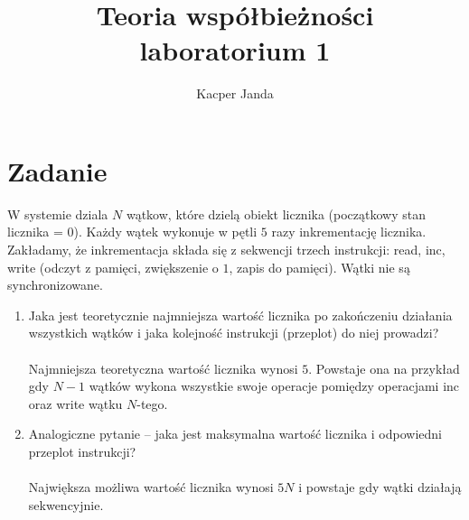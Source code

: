 \documentclass[11pt, a4paper]{article}
\begin{document}
\title{Teoria współbieżności\\laboratorium 1}
\author{Kacper Janda}
\maketitle

\section{Zadanie}
W systemie dziala \begin{math} N \end{math} wątkow, które dzielą obiekt licznika (początkowy stan licznika = \begin{math} 0 \end{math}). Każdy wątek wykonuje w pętli \begin{math} 5 \end{math} razy inkrementację licznika. Zakładamy, że inkrementacja składa się z sekwencji trzech instrukcji: read, inc, write (odczyt z pamięci, zwiększenie o \begin{math} 1 \end{math}, zapis do pamięci). Wątki nie są synchronizowane.

\begin{enumerate}

\item Jaka jest teoretycznie najmniejsza wartość licznika po zakończeniu działania wszystkich wątków i jaka kolejność instrukcji (przeplot) do niej prowadzi?\\\\
Najmniejsza teoretyczna wartość licznika wynosi \begin{math} 5 \end{math}. Powstaje ona na przykład gdy \begin{math} N-1 \end{math} wątków wykona wszystkie swoje operacje pomiędzy operacjami inc oraz write wątku \begin{math} N \end{math}-tego.\\

\item Analogiczne pytanie -- jaka jest maksymalna wartość licznika i odpowiedni przeplot instrukcji?\\\\
Największa możliwa wartość licznika wynosi \begin{math} 5N \end{math} i powstaje gdy wątki działają sekwencyjnie.

\end{enumerate}
\end{document}
